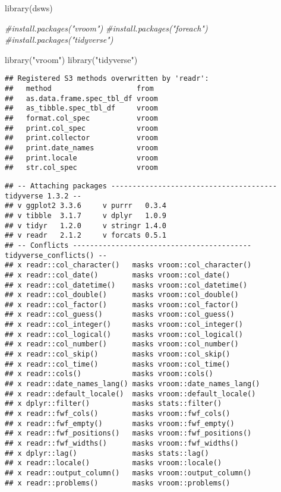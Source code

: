 \documentclass[
]{article}
\newenvironment{Shaded}{\begin{snugshade}}{\end{snugshade}}
\newcommand{\CommentTok}[1]{\textcolor[rgb]{0.56,0.35,0.01}{\textit{#1}}}
\newcommand{\FunctionTok}[1]{\textcolor[rgb]{0.00,0.00,0.00}{#1}}
\newcommand{\NormalTok}[1]{#1}
\newcommand{\StringTok}[1]{\textcolor[rgb]{0.31,0.60,0.02}{#1}}
\begin{document}
\begin{Shaded}
\begin{Highlighting}[]
\FunctionTok{library}\NormalTok{(dsws)}
\end{Highlighting}
\end{Shaded}

\begin{Shaded}
\begin{Highlighting}[]
\CommentTok{\#install.packages("vroom")}
\CommentTok{\#install.packages("foreach")}
\CommentTok{\#install.packages("tidyverse")}

\FunctionTok{library}\NormalTok{(}\StringTok{"vroom"}\NormalTok{)}
\FunctionTok{library}\NormalTok{(}\StringTok{"tidyverse"}\NormalTok{)}
\end{Highlighting}
\end{Shaded}

\begin{verbatim}
## Registered S3 methods overwritten by 'readr':
##   method                    from 
##   as.data.frame.spec_tbl_df vroom
##   as_tibble.spec_tbl_df     vroom
##   format.col_spec           vroom
##   print.col_spec            vroom
##   print.collector           vroom
##   print.date_names          vroom
##   print.locale              vroom
##   str.col_spec              vroom
\end{verbatim}

\begin{verbatim}
## -- Attaching packages --------------------------------------- tidyverse 1.3.2 --
## v ggplot2 3.3.6     v purrr   0.3.4
## v tibble  3.1.7     v dplyr   1.0.9
## v tidyr   1.2.0     v stringr 1.4.0
## v readr   2.1.2     v forcats 0.5.1
## -- Conflicts ------------------------------------------ tidyverse_conflicts() --
## x readr::col_character()   masks vroom::col_character()
## x readr::col_date()        masks vroom::col_date()
## x readr::col_datetime()    masks vroom::col_datetime()
## x readr::col_double()      masks vroom::col_double()
## x readr::col_factor()      masks vroom::col_factor()
## x readr::col_guess()       masks vroom::col_guess()
## x readr::col_integer()     masks vroom::col_integer()
## x readr::col_logical()     masks vroom::col_logical()
## x readr::col_number()      masks vroom::col_number()
## x readr::col_skip()        masks vroom::col_skip()
## x readr::col_time()        masks vroom::col_time()
## x readr::cols()            masks vroom::cols()
## x readr::date_names_lang() masks vroom::date_names_lang()
## x readr::default_locale()  masks vroom::default_locale()
## x dplyr::filter()          masks stats::filter()
## x readr::fwf_cols()        masks vroom::fwf_cols()
## x readr::fwf_empty()       masks vroom::fwf_empty()
## x readr::fwf_positions()   masks vroom::fwf_positions()
## x readr::fwf_widths()      masks vroom::fwf_widths()
## x dplyr::lag()             masks stats::lag()
## x readr::locale()          masks vroom::locale()
## x readr::output_column()   masks vroom::output_column()
## x readr::problems()        masks vroom::problems()
\end{verbatim}
\end{document}

